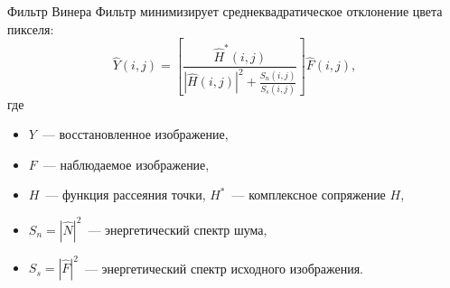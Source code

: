
\begin{frame}{Фильтр Винера}
    Фильтр минимизирует среднеквадратическое отклонение цвета пикселя:
    \[
        \hat{Y}(i, j) = \left[ \frac{\hat{H}^*(i, j)}{\left|\hat{H}(i, j)\right|^2
            + \frac{S_n(i, j)}{S_s(i, j)}} \right] \hat{F}(i, j),
    \]
    где
    \begin{itemize}
        \item $Y$~--- восстановленное изображение,
        \item $F$~--- наблюдаемое изображение,
        \item $H$~--- функция рассеяния точки, $H^*$~--- комплексное сопряжение $H$,
        \item $S_n = |\hat{N}|^2$~--- энергетический спектр шума,
        \item $S_s = |\hat{F}|^2$~--- энергетический спектр исходного изображения.
    \end{itemize}
\end{frame}

